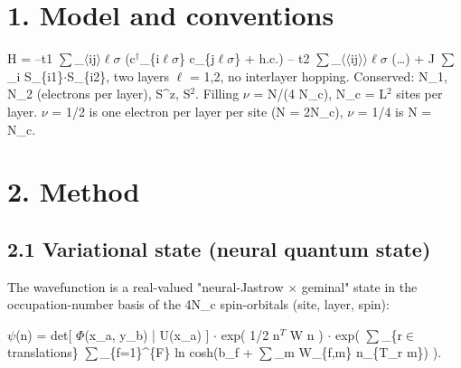 \documentclass[10pt]{article}
\begin{document}
\section*{1. Model and conventions}

H = --t1 $\sum$\_$\langle$ij$\rangle$$\ell$$\sigma$ (c$^\dagger$\_\{i$\ell$$\sigma$\} c\_\{j$\ell$$\sigma$\} + h.c.) -- t2 $\sum$\_$\langle$$\langle$ij$\rangle$$\rangle$$\ell$$\sigma$ (\ldots{}) + J $\sum$\_i S\_\{i1\}$\cdot$S\_\{i2\}, two layers $\ell$ = 1,2, no interlayer hopping. Conserved: N\_1, N\_2 (electrons per layer), S\^{}z, S$^2$. Filling $\nu$ = N/(4 N\_c), N\_c = L$^2$ sites per layer. $\nu$ = 1/2 is one electron per layer per site (N = 2N\_c), $\nu$ = 1/4 is N = N\_c.


\section*{2. Method}


\subsection*{2.1 Variational state (neural quantum state)}

The wavefunction is a real-valued "neural-Jastrow $\times$ geminal" state in the occupation-number basis of the 4N\_c spin-orbitals (site, layer, spin):

$\psi$(n) = det[ $\Phi$(x\_a, y\_b) | U(x\_a) ] $\cdot$ exp( 1/2 n$^T$ W n ) $\cdot$ exp( $\sum$\_\{r$\in$translations\} $\sum$\_\{f=1\}\^{}\{F\} ln cosh(b\_f + $\sum$\_m W\_\{f,m\} n\_\{T\_r m\}) ).
\end{document}
